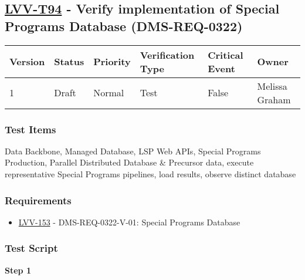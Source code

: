 \hypertarget{lvv-t94---verify-implementation-of-special-programs-database-dms-req-0322}{%
\subsection{\texorpdfstring{\href{https://jira.lsstcorp.org/secure/Tests.jspa\#/testCase/LVV-T94}{LVV-T94}
- Verify implementation of Special Programs Database
(DMS-REQ-0322)}{LVV-T94 - Verify implementation of Special Programs Database (DMS-REQ-0322)}}\label{lvv-t94---verify-implementation-of-special-programs-database-dms-req-0322}}

\begin{longtable}[]{@{}llllll@{}}
\toprule
Version & Status & Priority & Verification Type & Critical Event &
Owner\tabularnewline
\midrule
\endhead
1 & Draft & Normal & Test & False & Melissa Graham\tabularnewline
\bottomrule
\end{longtable}

\hypertarget{test-items-70}{%
\subsubsection{Test Items}\label{test-items-70}}

Data Backbone, Managed Database, LSP Web APIs, Special Programs
Production, Parallel Distributed Database \& Precursor data, execute
representative Special Programs pipelines, load results, observe
distinct database

\hypertarget{requirements-71}{%
\subsubsection{Requirements}\label{requirements-71}}

\begin{itemize}
\tightlist
\item
  \href{https://jira.lsstcorp.org/browse/LVV-153}{LVV-153} -
  DMS-REQ-0322-V-01: Special Programs Database
\end{itemize}

\hypertarget{test-script-71}{%
\subsubsection{Test Script}\label{test-script-71}}

\textbf{Step 1}\\
~\\
~\\

